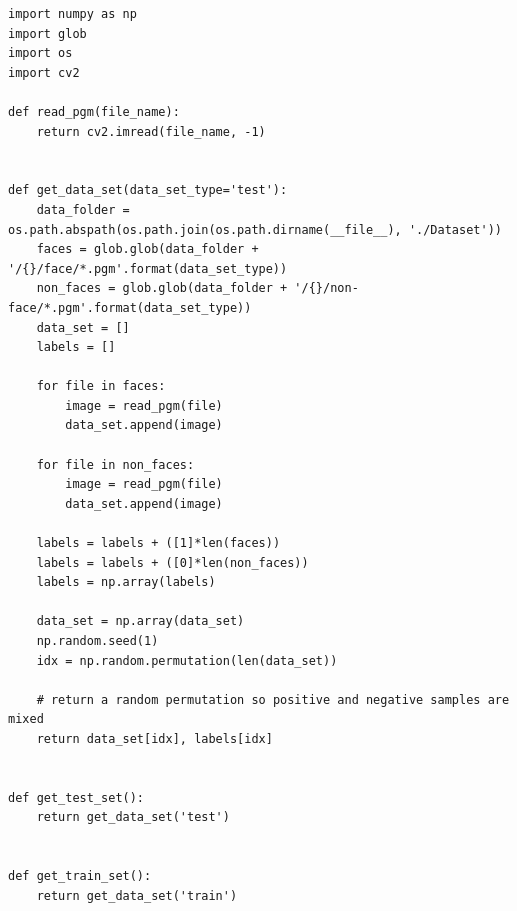 \begin{lstlisting}[style=py]
import numpy as np
import glob
import os
import cv2

def read_pgm(file_name):
    return cv2.imread(file_name, -1)


def get_data_set(data_set_type='test'):
    data_folder = os.path.abspath(os.path.join(os.path.dirname(__file__), './Dataset'))
    faces = glob.glob(data_folder + '/{}/face/*.pgm'.format(data_set_type))
    non_faces = glob.glob(data_folder + '/{}/non-face/*.pgm'.format(data_set_type))
    data_set = []
    labels = []

    for file in faces:
        image = read_pgm(file)
        data_set.append(image)

    for file in non_faces:
        image = read_pgm(file)
        data_set.append(image)

    labels = labels + ([1]*len(faces))
    labels = labels + ([0]*len(non_faces))
    labels = np.array(labels)

    data_set = np.array(data_set)
    np.random.seed(1)
    idx = np.random.permutation(len(data_set))

    # return a random permutation so positive and negative samples are mixed
    return data_set[idx], labels[idx]


def get_test_set():
    return get_data_set('test')


def get_train_set():
    return get_data_set('train')

\end{lstlisting}

